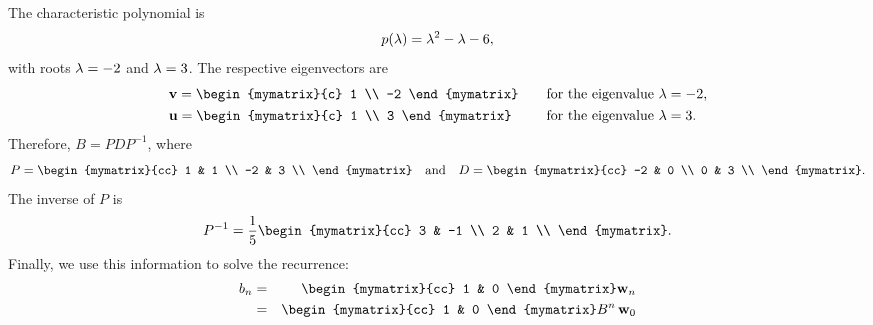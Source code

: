 \begin{solution}
  The characteristic polynomial is
  \begin{equation*}
    p(\lambda) = \lambda^2 - \lambda - 6,
  \end{equation*}
  with roots $\lambda=-2$ and $\lambda=3$. The respective eigenvectors
  are
  \begin{equation*}
    \begin{array}{ll}
      \vect{v} = \begin{mymatrix}{c} 1 \\ -2 \end{mymatrix}
        &\quad\mbox{for the eigenvalue $\eigenvar=-2$,}\\\\[-2ex]
      \vect{u} = \begin{mymatrix}{c} 1 \\ 3 \end{mymatrix}
        &\quad\mbox{for the eigenvalue $\eigenvar=3$.}
    \end{array}
  \end{equation*}
  Therefore, $B = PDP^{-1}$, where
  \begin{equation*}
    P = \begin{mymatrix}{cc}
      1 & 1 \\
      -2 & 3 \\
    \end{mymatrix}
    \quad\mbox{and}\quad
    D = \begin{mymatrix}{cc}
      -2 & 0 \\
      0 & 3 \\
    \end{mymatrix}.
  \end{equation*}
  The inverse of $P$ is
  \begin{equation*}
    P^{-1} =
    \frac{1}{5}
    \begin{mymatrix}{cc}
      3 & -1 \\
      2 &  1 \\
    \end{mymatrix}.
  \end{equation*}
  Finally, we use this information to solve the recurrence:
  \begin{eqnarray*}
    b_n
    &=& \begin{mymatrix}{cc} 1 & 0 \end{mymatrix}\vect{w}_n \\
    &=& \begin{mymatrix}{cc} 1 & 0 \end{mymatrix}B^n\,\vect{w}_0 \\

\end{eqnarray*}
\end{solution}
